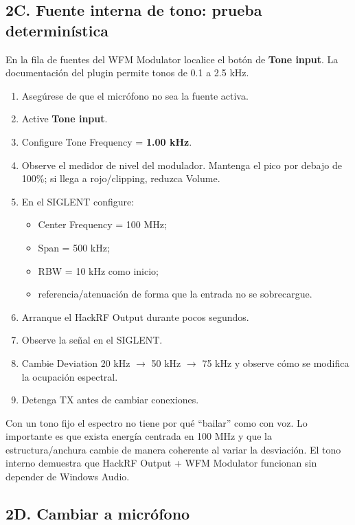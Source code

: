 \subsection{2C. Fuente interna de tono: prueba determinística}

En la fila de fuentes del WFM Modulator localice el botón de \textbf{Tone input}. La documentación del plugin permite tonos de 0.1 a 2.5 kHz.

\begin{enumerate}
    \item Asegúrese de que el micrófono no sea la fuente activa.
    \item Active \textbf{Tone input}.
    \item Configure Tone Frequency = \textbf{1.00 kHz}.
    \item Observe el medidor de nivel del modulador. Mantenga el pico por debajo de 100\%; si llega a rojo/clipping, reduzca Volume.
    \item En el SIGLENT configure:
    \begin{itemize}
        \item Center Frequency = 100 MHz;
        \item Span = 500 kHz;
        \item RBW = 10 kHz como inicio;
        \item referencia/atenuación de forma que la entrada no se sobrecargue.
    \end{itemize}
    \item Arranque el HackRF Output durante pocos segundos.
    \item Observe la señal en el SIGLENT.
    \item Cambie Deviation 20 kHz $\rightarrow$ 50 kHz $\rightarrow$ 75 kHz y observe cómo se modifica la ocupación espectral.
    \item Detenga TX antes de cambiar conexiones.
\end{enumerate}

\begin{esperado}
Con un tono fijo el espectro no tiene por qué ``bailar'' como con voz. Lo importante es que exista energía centrada en 100 MHz y que la estructura/anchura cambie de manera coherente al variar la desviación. El tono interno demuestra que HackRF Output + WFM Modulator funcionan sin depender de Windows Audio.
\end{esperado}

\subsection{2D. Cambiar a micrófono}

